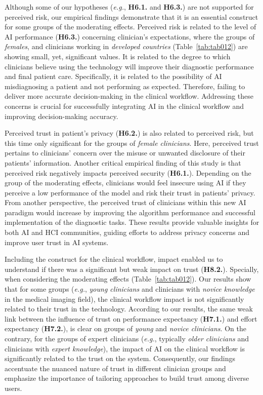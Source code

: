 Although some of our hypotheses ({\it e.g.}, {\bf H6.1.} and {\bf H6.3.}) are not supported for perceived risk, our empirical findings demonstrate that it is an essential construct for some groups of the moderating effects.
Perceived risk is related to the level of \ac{AI} performance ({\bf H6.3.}) concerning clinician's expectations, where the groups of {\it females}, and clinicians working in {\it developed countries} (Table~\ref{tab:tab012}) are showing small, yet, significant values.
It is related to the degree to which clinicians believe using the technology will improve their diagnostic performance and final patient care.
Specifically, it is related to the possibility of \ac{AI} misdiagnosing a patient and not performing as expected.
Therefore, failing to deliver more accurate decision-making in the clinical workflow.
Addressing these concerns is crucial for successfully integrating \ac{AI} in the clinical workflow and improving decision-making accuracy.

Perceived trust in patient's privacy ({\bf H6.2.}) is also related to perceived risk, but this time only significant for the groups of {\it female clinicians}.
Here, perceived trust pertains to clinicians' concern over the misuse or unwanted disclosure of their patients' information.
Another critical empirical finding of this study is that perceived risk negatively impacts perceived security ({\bf H6.1.}).
Depending on the group of the moderating effects, clinicians would feel insecure using \ac{AI} if they perceive a low performance of the model and risk their trust in patients' privacy.
From another perspective, the perceived trust of clinicians within this new \ac{AI} paradigm would increase by improving the algorithm performance and successful implementation of the diagnostic tasks.
These results provide valuable insights for both \ac{AI} and \ac{HCI} communities, guiding efforts to address privacy concerns and improve user trust in \ac{AI} systems.

Including the construct for the clinical workflow, impact enabled us to understand if there was a significant but weak impact on trust ({\bf H8.2.}).
Specially, when considering the moderating effects (Table~\ref{tab:tab012}).
Our results show that for some groups ({\it e.g.}, {\it young clinicians} and clinicians with {\it novice knowledge} in the medical imaging field), the clinical workflow impact is not significantly related to their trust in the technology.
According to our results, the same weak link between the influence of trust on performance expectancy ({\bf H7.1.}) and effort expectancy ({\bf H7.2.}), is clear on groups of {\it young} and {\it novice clinicians}.
On the contrary, for the groups of expert clinicians ({\it e.g.}, typically {\it older clinicians} and clinicians with {\it expert knowledge}), the impact of \ac{AI} on the clinical workflow is significantly related to the trust on the system.
Consequently, our findings accentuate the nuanced nature of trust in different clinician groups and emphasize the importance of tailoring approaches to build trust among diverse users.

